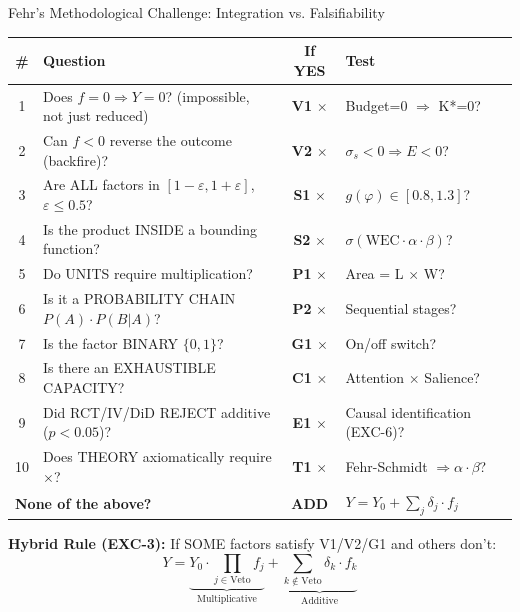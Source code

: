 \begin{chapter}{Fehr's Methodological Challenge: Integration vs. Falsifiability}
\begin{tcolorbox}[colback=yellow!5!white,colframe=orange!75!black,title=Decision Flowchart: When to Use Multiplicative]
\begin{center}
\renewcommand{\arraystretch}{1.4}
\small
\begin{tabular}{@{}clcp{5cm}@{}}
\toprule
\textbf{\#} & \textbf{Question} & \textbf{If YES} & \textbf{Test} \\
\midrule
1 & Does $f=0 \Rightarrow Y=0$? (impossible, not just reduced) & \textbf{V1} $\times$ & Budget=0 $\Rightarrow$ K*=0? \\
2 & Can $f<0$ reverse the outcome (backfire)? & \textbf{V2} $\times$ & $\sigma_s < 0 \Rightarrow E < 0$? \\
3 & Are ALL factors in $[1-\varepsilon, 1+\varepsilon]$, $\varepsilon \leq 0.5$? & \textbf{S1} $\times$ & $g(\varphi) \in [0.8, 1.3]$? \\
4 & Is the product INSIDE a bounding function? & \textbf{S2} $\times$ & $\sigma(\text{WEC} \cdot \alpha \cdot \beta)$? \\
5 & Do UNITS require multiplication? & \textbf{P1} $\times$ & Area = L $\times$ W? \\
6 & Is it a PROBABILITY CHAIN $P(A) \cdot P(B|A)$? & \textbf{P2} $\times$ & Sequential stages? \\
7 & Is the factor BINARY $\{0, 1\}$? & \textbf{G1} $\times$ & On/off switch? \\
8 & Is there an EXHAUSTIBLE CAPACITY? & \textbf{C1} $\times$ & Attention $\times$ Salience? \\
9 & Did RCT/IV/DiD REJECT additive ($p<0.05$)? & \textbf{E1} $\times$ & Causal identification (EXC-6)? \\
10 & Does THEORY axiomatically require $\times$? & \textbf{T1} $\times$ & Fehr-Schmidt $\Rightarrow \alpha \cdot \beta$? \\
\midrule
\multicolumn{2}{l}{\textbf{None of the above?}} & \textbf{ADD} & $Y = Y_0 + \sum_j \delta_j \cdot f_j$ \\
\bottomrule
\end{tabular}
\end{center}

\textbf{Hybrid Rule (EXC-3):} If SOME factors satisfy V1/V2/G1 and others don't:
\begin{equation}
Y = \underbrace{Y_0 \cdot \prod_{j \in \text{Veto}} f_j}_{\text{Multiplicative}} + \underbrace{\sum_{k \notin \text{Veto}} \delta_k \cdot f_k}_{\text{Additive}}
\end{equation}
\end{tcolorbox}


\end{chapter}

